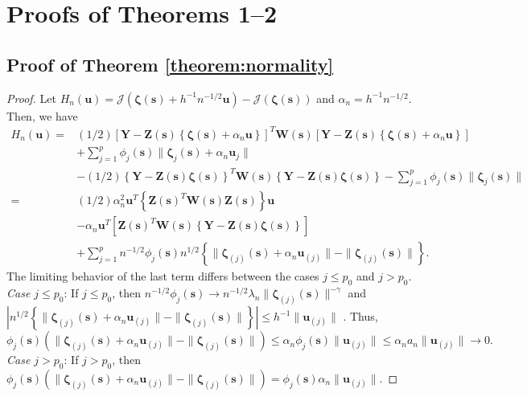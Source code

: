 \documentclass[authoryear,review, 12pt]{elsarticle}
\begin{document}
\clearpage

\appendix
\section{Proofs of Theorems 1--2}
\subsection*{Proof of Theorem \ref{theorem:normality}\label{sec:gaussian-normality-proof} }
\begin{proof}
Let $H_{n}(\bm{u})=\mathcal{J}\left(\bm{\zeta}(\bm{s})+h^{-1}n^{-1/2}\bm{u}\right)-\mathcal{J}\left(\bm{\zeta}(\bm{s})\right)$
and $\alpha_{n}=h^{-1}n^{-1/2}$. Then, we have 
\begin{align*}
H_{n}(\bm{u})= & (1/2)\left[\bm{Y}-\bm{Z}(\bm{s})\left\{ \bm{\zeta}(\bm{s})+\alpha_{n}\bm{u}\right\} \right]^{T}\bm{W}\!(\bm{s})\left[\bm{Y}-\bm{Z}(\bm{s})\left\{ \bm{\zeta}(\bm{s})+\alpha_{n}\bm{u}\right\} \right]\\
 & +\sum_{j=1}^{p}\phi_{j}(\bm{s})\|\bm{\zeta}_{j}(\bm{s})+\alpha_{n}\bm{u}_{j}\|\\
 & -(1/2)\left\{ \bm{Y}-\bm{Z}(\bm{s})\bm{\zeta}(\bm{s})\right\} ^{T}\bm{W}\!(\bm{s})\left\{ \bm{Y}-\bm{Z}(\bm{s})\bm{\zeta}(\bm{s})\right\} -\sum_{j=1}^{p}\phi_{j}(\bm{s})\|\bm{\zeta}_{j}(\bm{s})\|\\
= & \left(1/2\right)\alpha_{n}^{2}\bm{u}^{T}\left\{ \bm{Z}(\bm{s})^{T}\bm{W}\!(\bm{s})\bm{Z}(\bm{s})\right\} \bm{u}\\
 & -\alpha_{n}\bm{u}^{T}\left[\bm{Z}(\bm{s})^{T}\bm{W}\!(\bm{s})\left\{ \bm{Y}-\bm{Z}(\bm{s})\bm{\zeta}(\bm{s})\right\} \right]\\
 & +\sum_{j=1}^{p}n^{-1/2}\phi_{j}(\bm{s})n^{1/2}\left\{ \|\bm{\zeta}_{(j)}(\bm{s})+\alpha_{n}\bm{u}_{(j)}\|-\|\bm{\zeta}_{(j)}(\bm{s})\|\right\} .
\end{align*}
The limiting behavior of the last term differs between the cases $j\le p_{0}$
and $j>p_{0}$.
\emph{Case $j\le p_{0}$}: If $j\le p_{0}$, then $n^{-1/2}\phi_{j}(\bm{s})\to n^{-1/2}\lambda_{n}\|\bm{\zeta}_{(j)}(\bm{s})\|^{-\gamma}$
and $|n^{1/2}\left\{ \|\bm{\zeta}_{(j)}(\bm{s})+\alpha_{n}\bm{u}_{(j)}\|-\|\bm{\zeta}_{(j)}(\bm{s})\|\right\} |\le h^{-1}\|\bm{u}_{(j)}\|$
. Thus, 
\[
\phi_{j}(\bm{s})\left(\|\bm{\zeta}_{(j)}(\bm{s})+\alpha_{n}\bm{u}_{(j)}\|-\|\bm{\zeta}_{(j)}(\bm{s})\|\right)\le\alpha_{n}\phi_{j}(\bm{s})\|\bm{u}_{(j)}\|\le\alpha_{n}a_{n}\|\bm{u}_{(j)}\|\to0.
\]
\emph{Case $j>p_{0}$}: If $j>p_{0}$, then $\phi_{j}(\bm{s})\left(\|\bm{\zeta}_{(j)}(\bm{s})+\alpha_{n}\bm{u}_{(j)}\|-\|\bm{\zeta}_{(j)}(\bm{s})\|\right)=\phi_{j}(\bm{s})\alpha_{n}\|\bm{u}_{(j)}\|$.

\end{proof}
\end{document}
